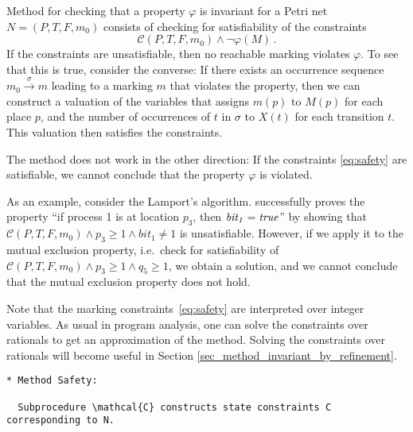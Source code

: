 Method \safety{} for checking that a property $\varphi$ is
invariant for a Petri net $N=(P,T,F,m_0)$ consists of checking for
satisfiability of the constraints
\begin{equation}\label{eq:safety}
\mathcal{C}(P,T,F,m_0) \wedge \lnot \varphi(M)\,.
\end{equation}
If the constraints are unsatisfiable, then no reachable marking
violates $\varphi$. To see that this is true, consider the converse:
If there exists an occurrence sequence $m_0
\xrightarrow{\sigma} m$ leading to a marking $m$ that violates the
property, then we can construct a valuation of the variables that assigns $m(p)$ to
$M(p)$ for each place $p$, and the number of occurrences of $t$ in
$\sigma$ to $X(t)$ for each transition $t$. This valuation then
satisfies the constraints.

The method does not work in the other direction: If the constraints
\eqref{eq:safety} are satisfiable, we cannot conclude that the
property $\varphi$ is violated.

As an example, consider the Lamport's algorithm. \safety{}
successfully proves the property ``if process
1 is at location $p_3$, then $\mathit{bit_1}={\it true}$'' by showing
that $\mathcal{C}(P,T,F,m_0) \wedge p_3 \geq 1 \wedge \mathit{bit}_1
\neq 1$ is unsatisfiable. However, if we apply it to the mutual
exclusion property, i.e.~check for satisfiability of
$\mathcal{C}(P,T,F,m_0) \wedge p_3 \geq 1\wedge q_5 \geq 1$, we obtain
a solution, and we cannot conclude that the mutual exclusion property
does not hold.

Note that the marking constraints~\eqref{eq:safety} are interpreted over integer
variables.
As usual in program analysis, one can solve the constraints over rationals to get an approximation
of the method. Solving the constraints over rationals will become
useful in Section \ref{sec_method_invariant_by_refinement}.

\iffalse

\begin{verbatim}
* Method Safety:

  Subprocedure \mathcal{C} constructs state constraints C corresponding to N.
\end{verbatim}




